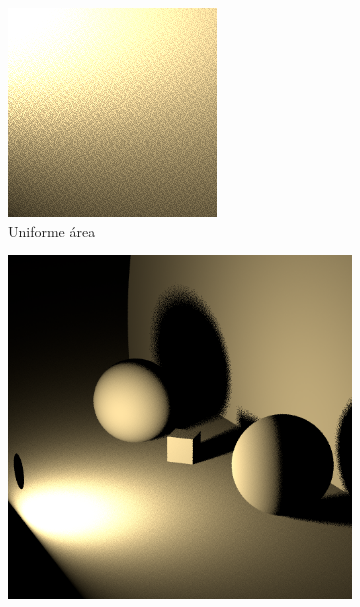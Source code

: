 \begin{figure}[h!]
{\begin{minipage}{\dimexpr .33\textwidth-\fboxsep-2\fboxrule}
\begin{subfigure}{\textwidth}
            \includegraphics[width=\textwidth]{imagenes/rect82}
            \caption{Uniforme área}
            \end{subfigure}  
    \end{minipage}
    \hfill
\begin{minipage}{\dimexpr .33\textwidth-\fboxsep-2\fboxrule}
   \begin{subfigure}{\textwidth}
            \centering
            \includegraphics[width=\textwidth]{imagenes/rect9}
            \vspace{0.2cm}


\end{subfigure}
\end{minipage}}
\end{figure}
